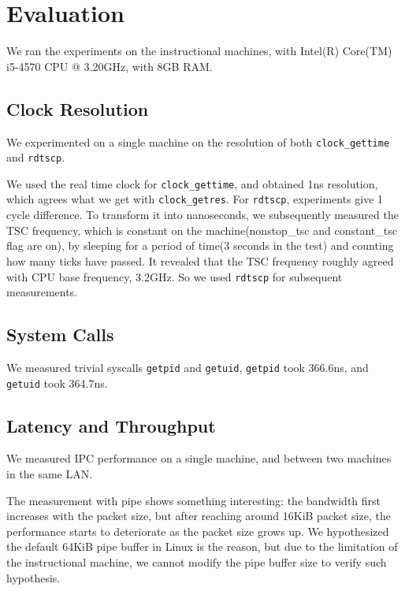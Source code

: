 \section{Evaluation}

We ran the experiments on the instructional machines, with Intel(R) Core(TM) i5-4570 CPU @ 3.20GHz, with 8GB RAM.

\subsection{Clock Resolution}

We experimented on a single machine on the resolution of both \texttt{clock\_gettime} and \texttt{rdtscp}.

We used the real time clock for \texttt{clock\_gettime}, and obtained 1ns resolution, which agrees what we get with \texttt{clock\_getres}. For \texttt{rdtscp}, experiments give 1 cycle difference. To transform it into nanoseconds, we subsequently measured the TSC frequency, which is constant on the machine(nonstop\_tsc and constant\_tsc flag are on), by sleeping for a period of time(3 seconds in the test) and counting how many ticks have passed. It revealed that the TSC frequency roughly agreed with CPU base frequency, 3.2GHz. So we used \texttt{rdtscp} for subsequent measurements.

\subsection{System Calls}

We measured trivial syscalls \texttt{getpid} and \texttt{getuid}, \texttt{getpid} took 366.6ns, and \texttt{getuid} took 364.7ns.

\subsection{Latency and Throughput}

We measured IPC performance on a single machine, and between two machines in the same LAN.

The measurement with pipe shows something interesting: the bandwidth first increases with the packet size, but after reaching around 16KiB packet size, the performance starts to deteriorate as the packet size grows up. We hypothesized the default 64KiB pipe buffer in Linux is the reason, but due to the limitation of the instructional machine, we cannot modify the pipe buffer size to verify such hypothesis.

